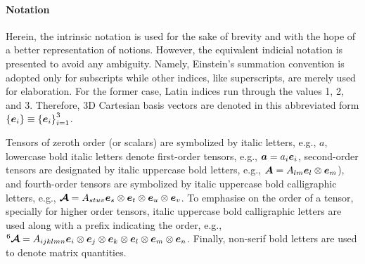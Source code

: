 	\paragraph{Notation} Herein, the intrinsic notation is used for the sake of brevity and with the hope of a better representation of notions. However, the equivalent indicial notation is presented to avoid any ambiguity. Namely, Einstein's summation convention is adopted only for subscripts while other indices, like superscripts, are merely used for elaboration. For the former case, Latin indices run through the values 1, 2, and 3. Therefore, 3D Cartesian basis vectors are denoted in this abbreviated form $\left\{\tena{e}_i\right\}\equiv\left\{\tena{e}_i\right\}_{i=1}^3$.
	
	
	Tensors of zeroth order (or scalars) are symbolized by italic letters, e.g., $a$, lowercase bold italic letters denote first-order tensors, e.g., $\tena{a} = a_i \tena{e}_i$, second-order tensors are designated by italic uppercase bold letters, e.g., $\tenb{A}= A_{lm} \tena{e}_l \dyad \tena{e}_m$), and fourth-order tensors are symbolized by italic uppercase bold calligraphic letters, e.g., $\tend{A}= A_{stuv} \tena{e}_s \dyad \tena{e}_t \dyad \tena{e}_u \dyad \tena{e}_v$. To emphasise on the order of a tensor, specially for higher order tensors, italic uppercase bold calligraphic letters are used along with a prefix indicating the order, e.g., $\tenn{A}{6}=A_{ijklmn} \tena{e}_i \dyad \tena{e}_j \dyad\tena{e}_k \dyad\tena{e}_l \dyad\tena{e}_m\dyad\tena{e}_n$. Finally, non-serif bold letters are used to denote matrix quantities.
	
